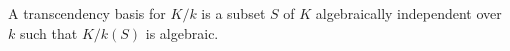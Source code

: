 A transcendency basis for $K/k$ is a subset $S$ of $K$ algebraically independent over $k$ such that $K/k(S)$ is algebraic.
